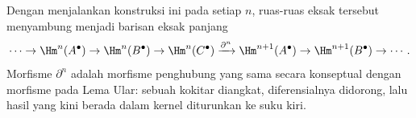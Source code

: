 Dengan menjalankan konstruksi ini pada setiap $n$, ruas-ruas eksak tersebut
menyambung menjadi barisan eksak panjang
\[
	\cdots\to\Hm^n(A^\bullet)\to\Hm^n(B^\bullet)\to\Hm^n(C^\bullet)
	\xrightarrow{\partial^n}\Hm^{n+1}(A^\bullet)\to\Hm^{n+1}(B^\bullet)
	\to\cdots.
\]
Morfisme $\partial^n$ adalah morfisme penghubung yang sama secara konseptual
dengan morfisme pada Lema Ular: sebuah kokitar diangkat, diferensialnya
didorong, lalu hasil yang kini berada dalam kernel diturunkan ke suku kiri.

